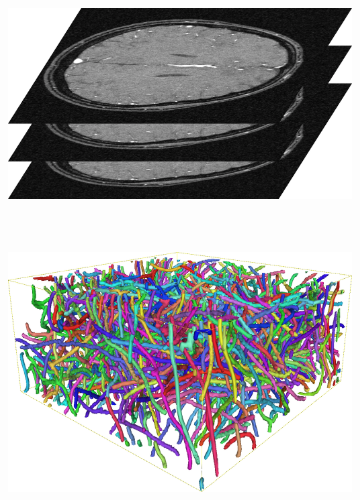 \begin{figure}[t]
\begin{subfigure}[b]{\hwidth}
	\end{subfigure}
	\hfill
	\begin{subfigure}[b]{\hwidth}
		\includegraphics[height=.80\textwidth, width=\textwidth,keepaspectratio]{figures/intro/mri_im.png}
	\end{subfigure}\hfill\null\\
	\null\hfill
	\begin{subfigure}[b]{\hwidth}
		\includegraphics[height=.80\textwidth, width=\textwidth,keepaspectratio]{figures/intro/em_skel.png}
		\caption{\label{fig:intro_em}}
	\end{subfigure}

\end{figure}
